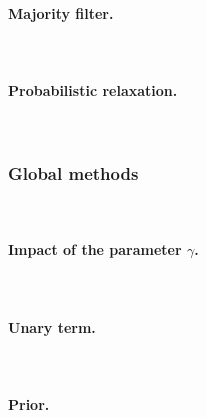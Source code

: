 \paragraph{Majority filter. \\}~\vspace*{-1cm}
~\vspace*{-1cm}
~\vspace*{-1cm}

\paragraph{Probabilistic relaxation. \\}~\vspace*{-1cm}
~\vspace*{-1cm}

\subsubsection{Global methods}~\vspace*{-1cm}

\paragraph{Impact of the parameter $\gamma$. \\}~\vspace*{-1cm}
~\vspace*{-1cm}
~\vspace*{-1cm}
~\vspace*{-1cm}
~\vspace*{-1cm}

\paragraph{Unary term. \\}~\vspace*{-1cm}
~\vspace*{-1cm}
~\vspace*{-1cm}

\paragraph{Prior. \\}~\vspace*{-1cm}
~\vspace*{-1cm}
~\vspace*{-1cm}
~\vspace*{-1cm}
~\vspace*{-1cm}

\stopcontents[chapters]